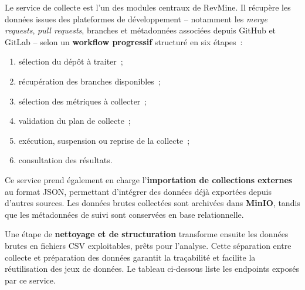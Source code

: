 Le service de collecte est l'un des modules centraux de RevMine. Il récupère les données issues
des plateformes de développement -- notamment les \textit{merge requests}, \textit{pull requests},
branches et métadonnées associées depuis GitHub et GitLab -- selon un \textbf{workflow progressif}
structuré en six étapes~:

\begin{enumerate}
    \item sélection du dépôt à traiter~;
    \item récupération des branches disponibles~;
    \item sélection des métriques à collecter~;
    \item validation du plan de collecte~;
    \item exécution, suspension ou reprise de la collecte~;
    \item consultation des résultats.
\end{enumerate}

Ce service prend également en charge l'\textbf{importation de collections externes} au format
JSON, permettant d'intégrer des données déjà exportées depuis d'autres sources. Les données brutes
collectées sont archivées dans \textbf{MinIO}, tandis que les métadonnées de suivi sont conservées
en base relationnelle.

Une étape de \textbf{nettoyage et de structuration} transforme ensuite les données brutes en
fichiers CSV exploitables, prêts pour l'analyse. Cette séparation entre collecte et préparation
des données garantit la traçabilité et facilite la réutilisation des jeux de données. Le tableau
ci-dessous liste les endpoints exposés par ce service.

